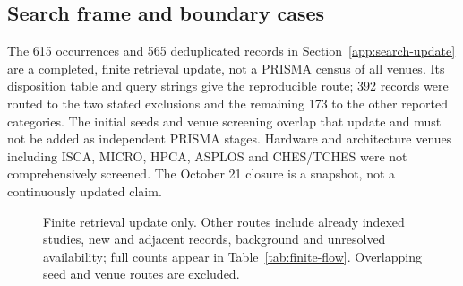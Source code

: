 \subsection{Search frame and boundary cases}
The 615 occurrences and 565 deduplicated records in Section~\ref{app:search-update} are a completed, finite retrieval update, not a PRISMA census of all venues. Its disposition table and query strings give the reproducible route; 392 records were routed to the two stated exclusions and the remaining 173 to the other reported categories. The initial seeds and venue screening overlap that update and must not be added as independent PRISMA stages. Hardware and architecture venues including ISCA, MICRO, HPCA, ASPLOS and CHES/TCHES were not comprehensively screened. The October 21 closure is a snapshot, not a continuously updated claim.

\begin{figure}[ht]\centering
{}
\caption{Finite retrieval update only. Other routes include already indexed studies, new and adjacent records, background and unresolved availability; full counts appear in Table~\ref{tab:finite-flow}. Overlapping seed and venue routes are excluded.}\label{fig:r36-search-flow}
\end{figure}


